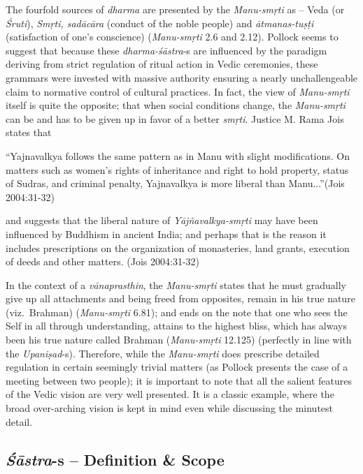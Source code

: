 The fourfold sources of {\sl dharma} are presented by the {\sl Manu-smṛti} as -- Veda (or {\sl Śruti}), {\sl Smṛti, sadācāra} (conduct of the noble people) and {\sl ātmanas-tuṣṭi} (satisfaction of one's conscience) ({\sl Manu-smṛti} 2.6 and 2.12). Pollock seems to suggest that because these \hbox{{\sl dharma-śāstra}-s} are influenced by the paradigm deriving from strict regulation of ritual action in Vedic ceremonies, these grammars were invested with massive authority ensuring a nearly unchallengeable claim to normative control of cultural practices. In fact, the view of {\sl Manu-smṛti} itself is quite the opposite; that when social conditions change, the {\sl Manu-smṛti} can be and has to be given up in favor of a better {\sl smṛti}. Justice M. Rama Jois states that
\begin{myquote}
``Yajnavalkya follows the same pattern as in Manu with slight modifications. On matters such as women's rights of inheritance and right to hold property, status of Sudras, and criminal penalty, Yajnavalkya is more liberal than Manu...''\hfill (Jois 2004:31-32)
\end{myquote}
and suggests that the liberal nature of {\sl Yājñavalkya-smṛti} may have been influenced by Buddhism in ancient India; and perhaps that is the reason it includes prescriptions on the organization of monasteries, land grants, execution of deeds and other matters. (Jois 2004:31-32)

In the context of a {\sl vānaprasthin}, the {\sl Manu-smṛti} states that he must gradually give up all attachments and being freed from opposites, remain in his true nature (viz.\ Brahman) ({\sl Manu-smṛti} 6.81); and ends on the note that one who sees the Self in all through understanding, attains to the highest bliss, which has always been his true nature called Brahman ({\sl Manu-smṛti} 12.125) (perfectly in line with the {\sl Upaniṣad}-s). Therefore, while the {\sl Manu-smṛti} does prescribe detailed regulation in certain seemingly trivial matters (as Pollock presents the case of a meeting between two people); it is important to note that all the salient features of the Vedic vision are very well presented. It is a classic example, where the broad over-arching vision is kept in mind even while discussing the minutest detail.

\subsection{{{\sl\bfseries Śāstra}\relax}-s -- Definition \& Scope}\label{art12-sec3.4}


